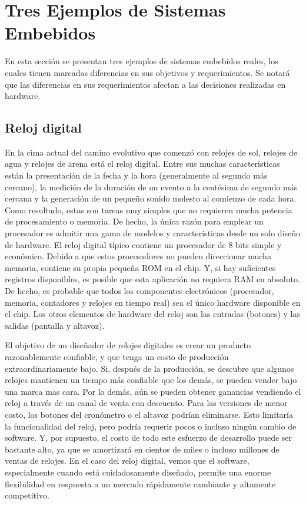 \documentclass[output=paper, 
colorlinks,
citecolor=brown,
newtxmath
]{langscibook}
\begin{document}
\section {Tres Ejemplos de Sistemas Embebidos}

En esta sección se presentan tres ejemplos de sistemas
embebidos reales, los cuales tienen marcadas
diferencias en sus objetivos y 
requerimientos. Se notará que las diferencias
en sus requerimientos afectan a las decisiones realizadas
en hardware. 

\subsection {Reloj digital}

En la cima actual del camino evolutivo que comenzó con relojes de sol, relojes de agua y relojes de arena está el reloj digital.
Entre sus muchas características están la presentación de la fecha y la hora 
(generalmente al segundo más cercano), la medición de la duración de un evento a la centésima de 
segundo más cercana y la generación de un pequeño sonido molesto al comienzo de cada hora. 
Como resultado, estas son tareas muy simples que no requieren mucha potencia de procesamiento o memoria. 
De hecho, la única razón para emplear un procesador es admitir una gama de modelos y 
características desde un solo diseño de hardware.
El reloj digital típico contiene un procesador de 8 bits simple y económico. Debido a que estos procesadores 
no pueden direccionar mucha memoria, contiene su propia pequeña ROM en el chip. 
Y, si hay suficientes registros disponibles, es posible que esta aplicación 
no requiera RAM en absoluto. De hecho, es probable que todos los componentes 
electrónicos (procesador, memoria, contadores y relojes en tiempo real) sea el único hardware
disponible en el chip.
Los otros elementos de hardware del reloj son las entradas (botones) y las salidas (pantalla y altavoz).

El objetivo de un diseñador de relojes digitales es crear un producto razonablemente 
confiable, y que tenga un costo de producción extraordinariamente bajo. 
Si, después de la producción, se descubre que algunos relojes mantienen un 
tiempo más confiable que los demás, se pueden vender bajo una marca mas cara.
Por lo demás, aún se pueden obtener ganancias vendiendo el reloj a través 
de un canal de venta con descuento. Para las versiones de menor costo, 
los botones del cronómetro o el altavoz podrían eliminarse. 
Esto limitaría la funcionalidad del reloj, pero podría requerir pocos o incluso 
ningún cambio de software. Y, por supuesto, el costo de todo este esfuerzo de 
desarrollo puede ser bastante alto, ya que se amortizará en cientos de miles o 
incluso millones de ventas de relojes.
En el caso del reloj digital, vemos que el software, especialmente cuando está 
cuidadosamente diseñado, permite una enorme flexibilidad en respuesta a un mercado 
rápidamente cambiante y altamente competitivo.
\end{document}
